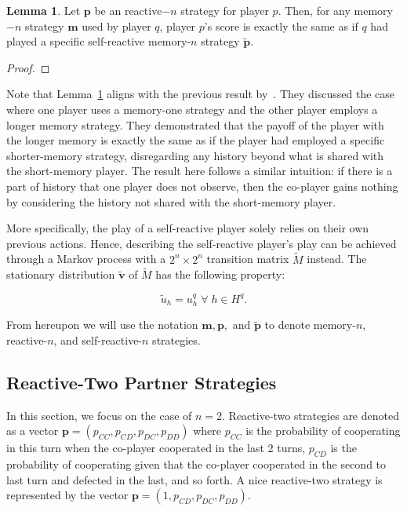 \documentclass{article}
\theoremstyle{definition}
\newtheorem{lemma}[theorem]{Lemma}
\begin{document}
\begin{lemma}\label{lemma:self_reactive_sufficiency}
  Let $\mathbf{p}$ be an reactive$-n$ strategy for player $p$. Then, for any
  memory$-n$ strategy $\mathbf{m}$ used by player $q$, player $p$'s score is
  exactly the same as if $q$ had played a specific self-reactive memory-$n$
  strategy $\mathbf{\tilde{p}}$.
\end{lemma}

\begin{proof}
\end{proof}

Note that Lemma~\ref{lemma:self_reactive_sufficiency} aligns with the previous
result by~\cite{press:PNAS:2012}. They discussed the case where one player uses
a memory-one strategy and the other player employs a longer memory strategy.
They demonstrated that the payoff of the player with the longer memory is
exactly the same as if the player had employed a specific shorter-memory
strategy, disregarding any history beyond what is shared with the short-memory
player. The result here follows a similar intuition: if there is a part of
history that one player does not observe, then the co-player gains nothing by
considering the history not shared with the short-memory player.

More specifically, the play of a self-reactive player solely relies on their own
previous actions. Hence, describing the self-reactive player's play can be
achieved through a Markov process with a $2^{n}\!\times\!2^{n}$ transition
matrix $\tilde{M}$ instead. The stationary distribution $\mathbf{\tilde{v}}$ of
$\tilde{M}$ has the following property:

\begin{equation}
  \tilde{u}_{h} = u^q_{h} \; \forall \; h \in H^q.
\end{equation}

From hereupon we will use the notation $\mathbf{m}, \mathbf{p}, \text{ and }
\mathbf{\tilde{p}}$ to denote memory-$n$, reactive-$n$, and self-reactive-$n$
strategies.

\subsection{Reactive-Two Partner Strategies}

In this section, we focus on the case of $n=2$. Reactive-two strategies are denoted as a vector
$\mathbf{p}=(p_{CC}, p_{CD}, p_{DC}, p_{DD})$ where $p_{CC}$ is the
probability of cooperating in this turn when the co-player cooperated in the
last 2 turns, $p_{CD}$ is the probability of cooperating given that the
co-player cooperated in the second to last turn and defected in the last, and so
forth. A nice reactive-two strategy is represented by the vector $\mathbf{p}=(1,
p_{CD}, p_{DC}, p_{DD})$.
\end{document}
